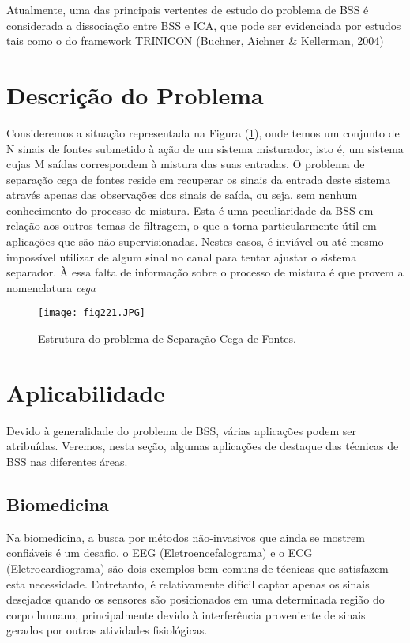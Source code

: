     
    Atualmente, uma das principais vertentes de estudo do problema de BSS é considerada a dissociação entre BSS e ICA, que pode ser evidenciada por estudos tais como o do framework TRINICON (Buchner, Aichner \& Kellerman, 2004)
    
\section{Descrição do Problema}
    
    Consideremos a situação representada na Figura (\ref{fig:structure}), onde temos um conjunto de N sinais de fontes submetido à ação de um sistema misturador, isto é, um sistema cujas M saídas correspondem à mistura das suas entradas. O problema de separação cega de fontes reside em recuperar os sinais da entrada deste sistema através apenas das observações dos sinais de saída, ou seja, sem nenhum conhecimento do processo de mistura. Esta é uma peculiaridade da BSS em relação aos outros temas de filtragem, o que a torna particularmente útil em aplicações que são não-supervisionadas. Nestes casos, é inviável ou até mesmo impossível utilizar de algum sinal no canal para tentar ajustar o sistema separador. À essa falta de informação sobre o processo de mistura é que provem a nomenclatura \textit{cega}
    
    \begin{figure}
       \hfill\texttt{[image: fig221.JPG]}\hspace*{\fill}
        \caption{Estrutura do problema de Separação Cega de Fontes.}
        \label{fig:structure}
    \end{figure}


\section{Aplicabilidade}
    Devido à generalidade do problema de BSS, várias aplicações podem ser atribuídas. Veremos, nesta seção, algumas aplicações de destaque das técnicas de BSS nas diferentes áreas.
    
\subsection{Biomedicina}
    Na biomedicina, a busca por métodos não-invasivos que ainda se mostrem confiáveis é um desafio. o EEG (Eletroencefalograma) e o ECG (Eletrocardiograma) são dois exemplos bem comuns de técnicas que satisfazem esta necessidade. Entretanto, é relativamente difícil captar apenas os sinais desejados quando os sensores são posicionados em uma determinada região do corpo humano, principalmente devido à interferência proveniente de sinais gerados por outras atividades fisiológicas.
       
